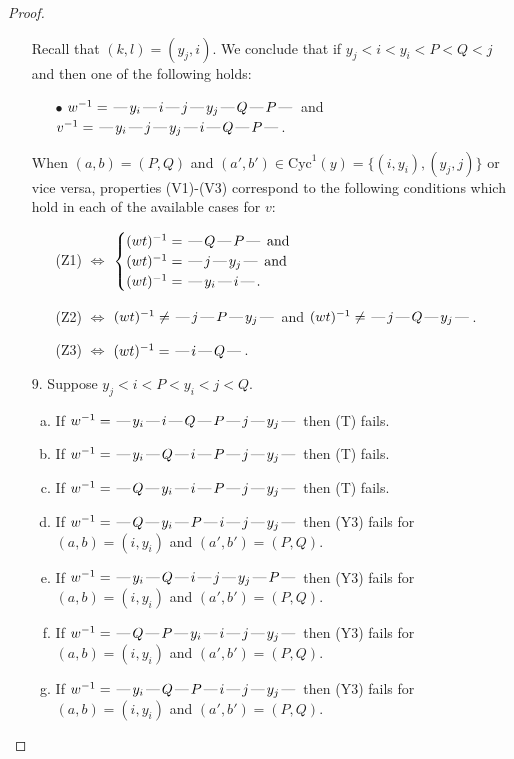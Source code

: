 \documentclass[10pt]{article}
\theoremstyle{definition}
\theoremstyle{definition}
\def\dash{\text{\hspace{0.5mm}---\hspace{0.5mm}}}
\def\Cyc{\mathrm{Cyc}}
\begin{document}
\begin{proof}
\begin{enumerate}
\begin{enumerate}[(a)]
\end{enumerate}
Recall that $(k,l) = (y_j,i)$.
We conclude that if $y_j < i < y_i < P < Q < j$ and then one of the following holds:
\begin{enumerate}
\item[$\bullet$] $w^{-1} = \dash y_i\dash i\dash j\dash y_j\dash Q\dash P\dash $ and $v^{-1} = \dash y_i\dash j\dash y_j\dash i\dash Q\dash P\dash $.
\end{enumerate}
When $(a,b)= (P,Q)$ and $(a',b')\in \Cyc^1(y)=\{(i,y_i),(y_j,j)\}$ or vice versa,
properties (V1)-(V3) correspond to the following conditions which hold in
each of the available cases for $v$:
\begin{enumerate}
\item[](Z1) $\Leftrightarrow$ $\begin{cases}\text{$(wt)^{-1} = \dash Q \dash P \dash$}\text{ and }\\
\text{$(wt)^{-1} = \dash j \dash y_j \dash$}\text{ and }\\
\text{$(wt)^{-1} = \dash y_i \dash i \dash$}.\end{cases}$
\item[](Z2) $\Leftrightarrow$ $(wt)^{-1} \neq \dash j \dash P \dash y_j \dash$ and $(wt)^{-1}\neq \dash j \dash Q \dash y_j \dash$.
\item[](Z3) $\Leftrightarrow$ $(wt)^{-1} = \dash i \dash Q \dash$.
\end{enumerate}
\item[$9$.] Suppose $y_j < i < P < y_i < j < Q$.
\begin{enumerate}[(a)]
\item If $w^{-1} = \dash y_i\dash i\dash Q\dash P\dash j\dash y_j\dash $ then (T) fails.
\item If $w^{-1} = \dash y_i\dash Q\dash i\dash P\dash j\dash y_j\dash $ then (T) fails.
\item If $w^{-1} = \dash Q\dash y_i\dash i\dash P\dash j\dash y_j\dash $ then (T) fails.
\item If $w^{-1} = \dash Q\dash y_i\dash P\dash i\dash j\dash y_j\dash $ then (Y3) fails for $(a,b)=(i,y_i)$ and $(a',b')=(P,Q)$.
\item If $w^{-1} = \dash y_i\dash Q\dash i\dash j\dash y_j\dash P\dash $ then (Y3) fails for $(a,b)=(i,y_i)$ and $(a',b')=(P,Q)$.
\item If $w^{-1} = \dash Q\dash P\dash y_i\dash i\dash j\dash y_j\dash $ then (Y3) fails for $(a,b)=(i,y_i)$ and $(a',b')=(P,Q)$.
\item If $w^{-1} = \dash y_i\dash Q\dash P\dash i\dash j\dash y_j\dash $ then (Y3) fails for $(a,b)=(i,y_i)$ and $(a',b')=(P,Q)$.

\end{enumerate}
\end{enumerate}
\end{proof}
\end{document}
